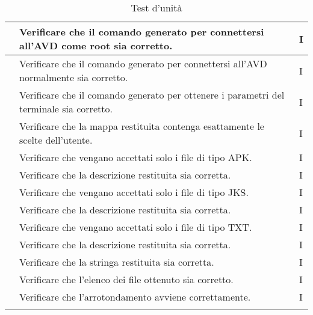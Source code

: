 \begin{longtable}{ |C{3cm} | C{8.5cm}| C{1.5cm} |}
     & Verificare che il comando generato per connettersi all'AVD come root sia corretto.
    & I \\\hline
     & Verificare che il comando generato per connettersi all'AVD normalmente sia corretto.
    & I \\\hline
     & Verificare che il comando generato per ottenere i parametri del terminale sia corretto.
    & I \\\hline
     & Verificare che la mappa restituita contenga esattamente le scelte dell'utente.
    & I \\\hline
     & Verificare che vengano accettati solo i file di tipo APK.
    & I \\\hline
     & Verificare che la descrizione restituita sia corretta.
    & I \\\hline
     & Verificare che vengano accettati solo i file di tipo JKS.
    & I \\\hline
     & Verificare che la descrizione restituita sia corretta.
    & I \\\hline
     & Verificare che vengano accettati solo i file di tipo TXT.
    & I \\\hline
     & Verificare che la descrizione restituita sia corretta.
    & I \\\hline
     & Verificare che la stringa restituita sia corretta.
    & I \\\hline
     & Verificare che l'elenco dei file ottenuto sia corretto.
    & I \\\hline
     & Verificare che l'arrotondamento avviene correttamente.
    & I \\\hline
    \caption{Test d'unità}
\end{longtable}
\setcounter{rowcount}{0}

